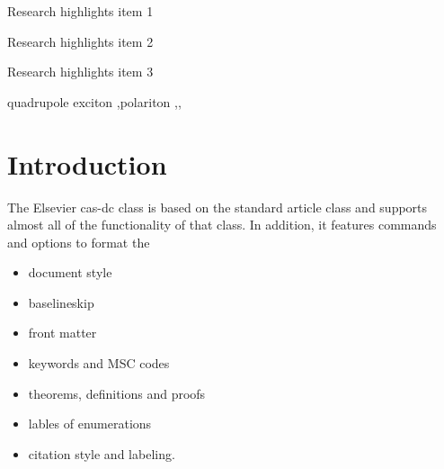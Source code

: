 \documentclass[a4paper,fleqn]{cas-dc}
\begin{document}
	\begin{abstract}
		This template helps you to create a properly formatted \LaTeX\ manuscript.
		
		\noindent\texttt{\textbackslash begin{abstract}} \dots 
		\texttt{\textbackslash end{abstract}} and
		\verb+\begin{keyword}+ \verb+...+ \verb+\end{keyword}+ 
		which
		contain the abstract and keywords respectively. 
		
		\noindent Each keyword shall be separated by a \verb+\sep+ command.
	\end{abstract}
	
	\begin{graphicalabstract}
	\end{graphicalabstract}
	
	\begin{highlights}
		\item Research highlights item 1
		\item Research highlights item 2
		\item Research highlights item 3
	\end{highlights}
	
	\begin{keywords}
		quadrupole exciton \sep polariton \sep \WGM \sep \BEC
	\end{keywords}
	
	
	\maketitle
	
	\section{Introduction}
	
	The Elsevier cas-dc class is based on the
	standard article class and supports almost all of the functionality of
	that class. In addition, it features commands and options to format the
	\begin{itemize} \item document style \item baselineskip \item front
		matter \item keywords and MSC codes \item theorems, definitions and
		proofs \item lables of enumerations \item citation style and labeling.
	\end{itemize}
	
\end{document}
